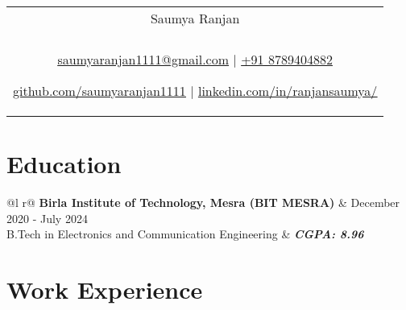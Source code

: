 \documentclass[a4paper,8pt]{article}
\begin{document}
\pagestyle{empty} 


\begin{tabularx}{\linewidth}{@{} C @{}}
\color[HTML]{1C033C} \Huge{Saumya Ranjan} \\[4pt]
\\
\textcolor[HTML]{371e77}{\underline{\href{mailto:saumyaranjan1111@gmail.com}{\raisebox{-0.05\height}{\faEnvelope} saumyaranjan1111@gmail.com}} $|$}
\textcolor[HTML]{371e77}{\href{tel:+918789404882}{\raisebox{-0.05\height}{\faMobile} +91 8789404882}}

\textcolor[HTML]{371e77}{\underline{\href{https://github.com/saumyaranjan1111}{\raisebox{-0.05\height}{\faGithub} github.com/saumyaranjan1111}} $|$}
\textcolor[HTML]{371e77}{\underline{\href{https://www.linkedin.com/in/ranjansaumya/}{\raisebox{-0.05\height}{\faLinkedin} linkedin.com/in/ranjansaumya/}}}
\end{tabularx}

\section{Education}
\begin{tabularx}{\linewidth}{ @{}l r@{} }
\color[HTML]{1C033C} \textbf{Birla Institute of Technology, Mesra (BIT MESRA)} & \hfill \color[HTML]{371e77} December 2020 - July 2024 \\
\color[HTML]{371e77} B.Tech in Electronics and Communication Engineering {} & \hfill \color[HTML]{4B28A4} \textit{\textbf{CGPA: 8.96}} \\
\end{tabularx}

\section{Work Experience}
\end{document}
